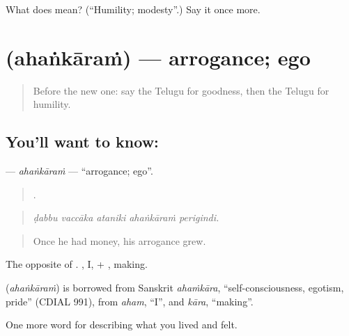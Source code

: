 \begin{tcolorbox}[breakable,colback=teal!4,colframe=teal!35!black,title={Before you move on}]
What does  mean? (\textquotedblleft{}Humility; modesty\textquotedblright{}.) Say it once more.
\end{tcolorbox}
\section[\texorpdfstring{\te{అహంకారం} (ahaṅkāraṁ)}{అహంకారం (ahaṅkāraṁ)}]{ (ahaṅkāraṁ) — arrogance; ego}

\label{lesson:TE-C507-ahankaram}



\begin{quote}
Before the new one: say the Telugu for goodness, then the Telugu for humility.
\end{quote}

\subsection*{You'll want to know: }
\textbf{} — \emph{ahaṅkāraṁ} — \textquotedblleft{}arrogance; ego\textquotedblright{}.

\begin{quote}
    .
\end{quote}

\begin{quote}
\emph{ḍabbu vaccāka ataniki ahaṅkāraṁ perigindi.}
\end{quote}

\begin{quote}
Once he had money, his arrogance grew.
\end{quote}

The opposite of . , I, + , making.

\begin{cousinweb}
\textbf{} (\emph{ahaṅkāraṁ}) is borrowed from Sanskrit \emph{ahaṁkāra}, \textquotedblleft{}self-consciousness, egotism, pride\textquotedblright{} (CDIAL 991), from \emph{aham}, \textquotedblleft{}I\textquotedblright{}, and \emph{kāra}, \textquotedblleft{}making\textquotedblright{}.
\end{cousinweb}

\begin{grammarlens}[title={What you've built}]
One more word for describing what you lived and felt.
\end{grammarlens}

